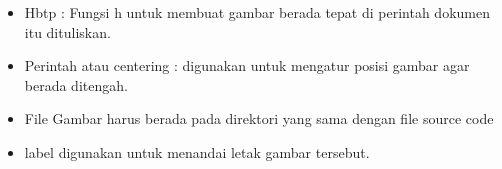 \begin{itemize}
\item Hbtp : Fungsi h untuk membuat gambar berada tepat di perintah dokumen itu dituliskan. 

\item Perintah atau centering : digunakan untuk mengatur posisi gambar agar berada ditengah.
\item File Gambar harus berada pada direktori yang sama dengan file source code
\item label digunakan untuk menandai letak gambar tersebut.
\end{itemize}

